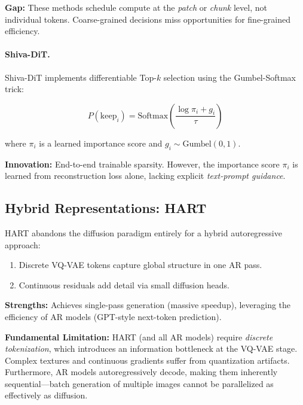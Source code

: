 \documentclass{article}
\begin{document}
\textbf{Gap:} These methods schedule compute at the \textit{patch} or
\textit{chunk} level, not individual tokens. Coarse-grained decisions
miss opportunities for fine-grained efficiency.

\paragraph{Shiva-DiT.}
Shiva-DiT \cite{zhang2026shiva} implements differentiable Top-$k$ selection
using the Gumbel-Softmax trick:

$$
    P(\text{keep}_i) = \text{Softmax}\left(\frac{\log \pi_i + g_i}{\tau}\right)
$$

where $\pi_i$ is a learned importance score and $g_i \sim \text{Gumbel}(0,1)$.

\textbf{Innovation:} End-to-end trainable sparsity. However, the importance
score $\pi_i$ is learned from reconstruction loss alone, lacking explicit
\textit{text-prompt guidance}.

\subsection{Hybrid Representations: HART}

HART \cite{tang2024hart} abandons the diffusion paradigm entirely for a
hybrid autoregressive approach:

\begin{enumerate}
    \item Discrete VQ-VAE tokens capture global structure in one AR pass.
    \item Continuous residuals add detail via small diffusion heads.
\end{enumerate}

\textbf{Strengths:} Achieves single-pass generation (massive speedup),
leveraging the efficiency of AR models (GPT-style next-token prediction).

\textbf{Fundamental Limitation:} HART (and all AR models) require
\textit{discrete tokenization}, which introduces an information bottleneck
at the VQ-VAE stage. Complex textures and continuous gradients suffer from
quantization artifacts. Furthermore, AR models autoregressively decode,
making them inherently sequential—batch generation of multiple images
cannot be parallelized as effectively as diffusion.

\end{document}
